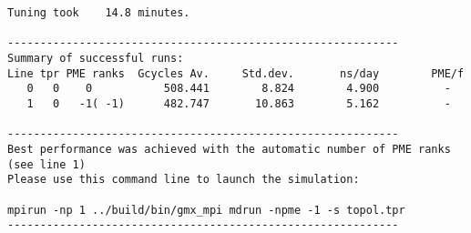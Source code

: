 \documentclass[12pt,a4paper,french]{article}
\begin{document}
\begin{lstlisting}[frame=single]
Tuning took    14.8 minutes.

------------------------------------------------------------
Summary of successful runs:
Line tpr PME ranks  Gcycles Av.     Std.dev.       ns/day        PME/f
   0   0    0           508.441        8.824        4.900          -  
   1   0   -1( -1)      482.747       10.863        5.162          -  

------------------------------------------------------------
Best performance was achieved with the automatic number of PME ranks (see line 1)
Please use this command line to launch the simulation:

mpirun -np 1 ../build/bin/gmx_mpi mdrun -npme -1 -s topol.tpr  
------------------------------------------------------------

\end{lstlisting}
\end{document}
